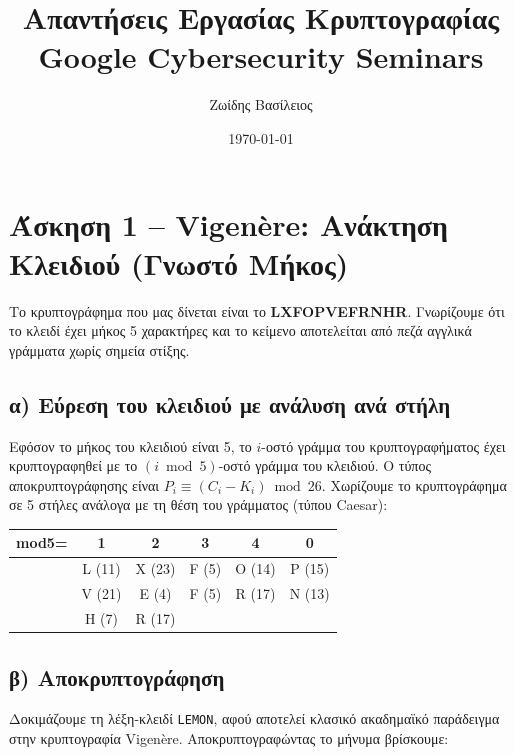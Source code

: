 \documentclass[12pt, a4paper]{article}
\title{\textbf{Απαντήσεις Εργασίας Κρυπτογραφίας}\\[1ex] \large Google Cybersecurity Seminars}
\author{Ζωίδης Βασίλειος}
\date{\today}
\begin{document}
\maketitle
\section*{Άσκηση 1 – Vigenère: Ανάκτηση Κλειδιού (Γνωστό Μήκος)}

Το κρυπτογράφημα που μας δίνεται είναι το \textbf{LXFOPVEFRNHR}. Γνωρίζουμε ότι το κλειδί έχει μήκος 5 χαρακτήρες και το κείμενο αποτελείται από πεζά αγγλικά γράμματα χωρίς σημεία στίξης.

\subsection*{α) Εύρεση του κλειδιού με ανάλυση ανά στήλη}

Εφόσον το μήκος του κλειδιού είναι 5, το $i$-οστό γράμμα του κρυπτογραφήματος έχει κρυπτογραφηθεί με το $(i \bmod 5)$-οστό γράμμα του κλειδιού. Ο τύπος αποκρυπτογράφησης είναι $P_i \equiv (C_i - K_i) \bmod{26}$. Χωρίζουμε το κρυπτογράφημα σε 5 στήλες ανάλογα με τη θέση του γράμματος (τύπου Caesar):
\begin{table}[htbp]
\begin{center}
\renewcommand{\arraystretch}{1.2}
\begin{tabular}{cc|c|c|c|c}
\textbf{mod5=} & \textbf{1} & \textbf{2} & \textbf{3} & \textbf{4} & \textbf{0} \\
\midrule
& L (11) & X (23) & F (5) & O (14) & P (15) \\
& V (21) & E (4)  & F (5) & R (17) & N (13) \\
& H (7)  & R (17) &       &        &        \\
\end{tabular}
\end{center}
\end{table}

\subsection*{β) Αποκρυπτογράφηση}
Δοκιμάζουμε τη λέξη-κλειδί \texttt{LEMON}, αφού αποτελεί κλασικό ακαδημαϊκό παράδειγμα στην κρυπτογραφία Vigenère. Αποκρυπτογραφώντας το μήνυμα βρίσκουμε:
\end{document}
